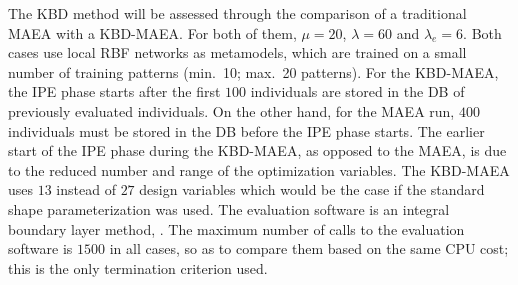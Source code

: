 The KBD method will be assessed through the comparison of a traditional MAEA with a KBD-MAEA. For both of them, $\mu=20$, $\lambda=60$ and $\lambda_e=6$. Both cases use local RBF networks as metamodels, which are trained on a small number of training patterns (min.\ 10; max.\ 20 patterns). For the KBD-MAEA, the IPE phase starts after the first $100$ individuals are stored in the DB of previously evaluated individuals. On the other hand, for the MAEA run, $400$ individuals must be stored in the DB before the IPE phase starts. The earlier start of the IPE phase during the KBD-MAEA, as opposed to the MAEA, is due to the reduced number and range of the optimization variables. The KBD-MAEA uses $13$ instead of $27$ design variables  which would be the case if the standard shape parameterization was used. The evaluation software is an integral boundary layer method, \cite{Drel1987}. The maximum number of calls to the evaluation software is $1500$ in all cases, so as to compare them based on the same CPU cost; this is the only termination criterion used.              

